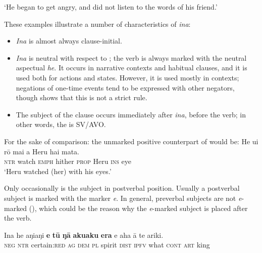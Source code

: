 \glt
‘He began to get angry, and did not listen to the words of his friend.’ \textstyleExampleref{[R237.152]} 
\z

These examples illustrate a number of characteristics of \textit{{\ꞌ}ina}:

\begin{itemize}
\item 
\textit{{\ꞌ}Ina} is almost always clause-initial.

\item 
\textit{{\ꞌ}Ina} is neutral with respect to ; the verb is always marked with the neutral aspectual \textit{he}. It occurs in narrative contexts and habitual clauses, and it is used both for actions and states. However, it is used mostly in  contexts; negations of one-time events tend to be expressed with other negators, though  shows that this is not a strict rule. 

\item 
The subject of the clause occurs immediately after \textit{{\ꞌ}ina}, before the verb; in other words, the  is SV/AVO. 

\end{itemize}

For the sake of comparison: the unmarked positive counterpart of  would be:
\ea\label{ex:10.88a}
\gll He u{\ꞌ}i rō mai a Heru hai mata.\\
\textsc{ntr} watch \textsc{emph} hither \textsc{prop} Heru \textsc{ins} eye\\

\glt 
‘Heru watched (her) with his eyes.’ \textstyleExampleref{[R313.165]} 
\z



Only occasionally is the subject in postverbal position. Usually a postverbal subject is marked with the  marker \textit{e}. In general, preverbal subjects are not \textit{e}{}-marked (), which could be the reason why the \textit{e}{}-marked subject is placed after the verb.

\ea\label{ex:10.93}
\gll {\ꞌ}Ina he aŋiaŋi \textbf{e} \textbf{tū} \textbf{ŋā} \textbf{{\ꞌ}aku{\ꞌ}aku} \textbf{era} e aha {\ꞌ}ā te {\ꞌ}ariki. \\
\textsc{neg} \textsc{ntr} certain:\textsc{red} \textsc{ag} \textsc{dem} \textsc{pl} spirit \textsc{dist} \textsc{ipfv} what \textsc{cont} \textsc{art} king \\

